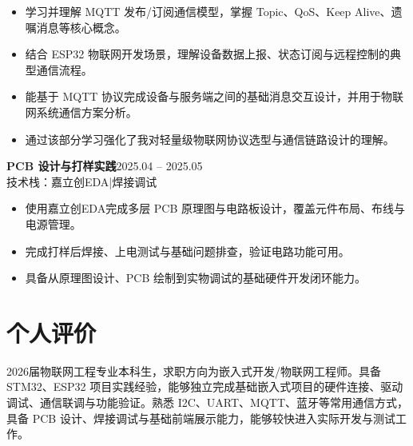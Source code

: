 \documentclass[10pt,a4paper]{article}
\newcommand{\projectblock}[3]{%
    {\bfseries\color{darktext}#1}\hfill{\color{graytext}#2}\\%
    {\small\color{graytext}#3}%
    \vspace{0.2em}%
}
\begin{document}
\begin{itemize}[leftmargin=1.5em, itemsep=4pt, parsep=0pt, topsep=4pt]
    \item 学习并理解 MQTT 发布/订阅通信模型，掌握 Topic、QoS、Keep Alive、遗嘱消息等核心概念。
    \item 结合 ESP32 物联网开发场景，理解设备数据上报、状态订阅与远程控制的典型通信流程。
    \item 能基于 MQTT 协议完成设备与服务端之间的基础消息交互设计，并用于物联网系统通信方案分析。
    \item 通过该部分学习强化了我对轻量级物联网协议选型与通信链路设计的理解。
\end{itemize}

\vspace{0.6em}

\projectblock{PCB 设计与打样实践}{2025.04 -- 2025.05}{技术栈：嘉立创EDA\hspace{0.3em}|\hspace{0.3em}焊接调试}

\begin{itemize}[leftmargin=1.5em, itemsep=4pt, parsep=0pt, topsep=4pt]
    \item 使用嘉立创EDA完成多层 PCB 原理图与电路板设计，覆盖元件布局、布线与电源管理。
    \item 完成打样后焊接、上电测试与基础问题排查，验证电路功能可用。
    \item 具备从原理图设计、PCB 绘制到实物调试的基础硬件开发闭环能力。
\end{itemize}

\vspace{0.6em}

\section{\faUser\hspace{0.4em}个人评价}

2026届物联网工程专业本科生，求职方向为嵌入式开发/物联网工程师。具备 STM32、ESP32 项目实践经验，能够独立完成基础嵌入式项目的硬件连接、驱动调试、通信联调与功能验证。熟悉 I2C、UART、MQTT、蓝牙等常用通信方式，具备 PCB 设计、焊接调试与基础前端展示能力，能够较快进入实际开发与测试工作。

\vspace{0.6em}
\end{document}
